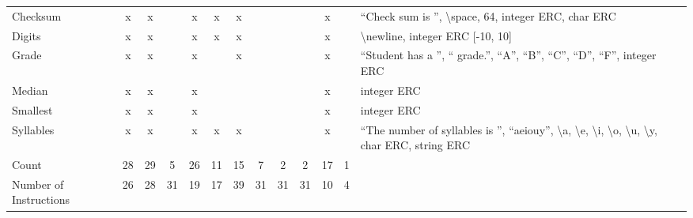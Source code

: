 \documentclass{sig-alternate}
\begin{document}
\begin{table*}[h]
\begin{tabular}{|l|ccccccccccc|p{6cm}|}
Checksum                   & x    & x       &       & x       & x    & x      &                    &                  &                   & x     &            & ``Check sum is '', \textbackslash space, 64, integer ERC, char ERC                                                                                                                                                            \\
Digits                     & x    & x       &       & x       & x    & x      &                    &                  &                   & x     &            & \textbackslash newline, integer ERC {[}-10, 10{]}                                                                                                                                                                           \\
Grade                      & x    & x       &       & x       &      & x      &                    &                  &                   & x     &            & ``Student has a '', `` grade.'', ``A'', ``B'', ``C'', ``D'', ``F'', integer ERC                                                                                                                                                           \\
Median                     & x    & x       &       & x       &      &        &                    &                  &                   & x     &            & integer ERC                                                                                                                                                                                                                 \\
Smallest                   & x    & x       &       & x       &      &        &                    &                  &                   & x     &            & integer ERC                                                                                                                                                                                                                 \\
Syllables                  & x    & x       &       & x       & x    & x      &                    &                  &                   & x     &            & ``The number of syllables is '', ``aeiouy'', \textbackslash a, \textbackslash e, \textbackslash i, \textbackslash o, \textbackslash u, \textbackslash y, char ERC, string ERC                                                   \\
\hline
Count                      & 28   & 29      & 5     & 26      & 11   & 15     & 7                  & 2                & 2                 & 17    & 1          & \\
Number of Instructions	& 26		& 28	& 	31	& 	19	& 	17	& 	39	& 	31	& 	31	& 	31	& 	10	& 	4	& \\
\hline
\end{tabular}
\end{table*}
\end{document}
